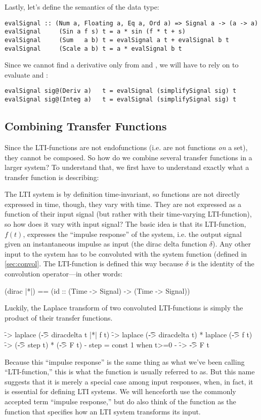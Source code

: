 Lastly, let's define the semantics of the data type:
\begin{verbatim}
evalSignal :: (Num a, Floating a, Eq a, Ord a) => Signal a -> (a -> a)
evalSignal     (Sin a f s) t = a * sin (f * t + s)
evalSignal     (Sum   a b) t = evalSignal a t + evalSignal b t
evalSignal     (Scale a b) t = a * evalSignal b t
\end{verbatim}
Since we cannot find a derivative only from  and , we will have to rely on  to evaluate  and :
\begin{verbatim}
evalSignal sig@(Deriv a)   t = evalSignal (simplifySignal sig) t
evalSignal sig@(Integ a)   t = evalSignal (simplifySignal sig) t
\end{verbatim}



\subsection{Combining Transfer Functions}\label{sec:comb}
Since the LTI-functions are not endofunctions (i.e. are not functions \textit{on} a set), they cannot be composed. So how do we combine several transfer functions in a larger system? To understand that, we first have to understand exactly what a transfer function is describing:

The LTI system is by definition time-invariant, so functions are not directly expressed in time, though, they vary with time. They are not expressed as a function of their input signal (but rather with their time-varying LTI-function), so how does it vary with input signal? The basic idea is that its LTI-function, $f(t)$, expresses the ``impulse response'' of the system, i.e. the output signal given an instantaneous impulse as input (the dirac delta function $\delta$). Any other input to the system has to be convoluted with the system function (defined in \ref{sec:convol}. 
The LTI-function is defined this way because $\delta$ is the identity of the convolution operator---in other words:
\begin{codeeq}
(dirac |*|) == (id :: (Time -> Signal) -> (Time -> Signal))
\end{codeeq}
Luckily, the Laplace transform of two convoluted LTI-functions is simply the product of their transfer functions.

\begin{codeeq}
\f -> laplace (\t -> diracdelta t |*| f t)
\f -> laplace (\t -> diracdelta t) * laplace (\t -> f t)
\f -> (\t -> step t) * (\t -> F t)
{- step = const 1 when t>=0 -}
\f -> \t -> F t
\end{codeeq}
Because this ``impulse response'' is the same thing as what we've been calling ``LTI-function,'' this is what the function is usually referred to as. But this name suggests that it is merely a special case among input responses, when, in fact, it is essential for defining LTI systems. We will henceforth use the commonly accepted term ``impulse response,'' but do also think of the function as the function that specifies how an LTI system transforms its input.


